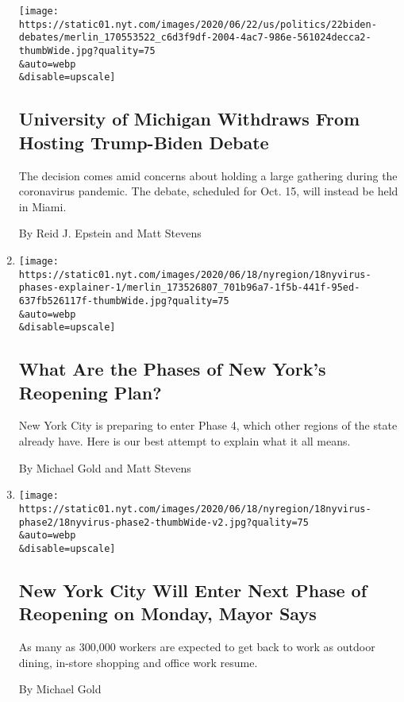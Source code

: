 \begin{enumerate}
  \texttt{[image: https://static01.nyt.com/images/2020/06/22/us/politics/22biden-debates/merlin\_170553522\_c6d3f9df-2004-4ac7-986e-561024decca2-thumbWide.jpg?quality=75\\\&auto=webp\\\&disable=upscale]}

  \hypertarget{university-of-michigan-withdraws-from-hosting-trump-biden-debate}{%
  \subsection{University of Michigan Withdraws From Hosting Trump-Biden
  Debate}\label{university-of-michigan-withdraws-from-hosting-trump-biden-debate}}

  The decision comes amid concerns about holding a large gathering
  during the coronavirus pandemic. The debate, scheduled for Oct. 15,
  will instead be held in Miami.

  By Reid J. Epstein and Matt Stevens
\item
  \href{/article/new-york-phase-reopening.html}{}

  \texttt{[image: https://static01.nyt.com/images/2020/06/18/nyregion/18nyvirus-phases-explainer-1/merlin\_173526807\_701b96a7-1f5b-441f-95ed-637fb526117f-thumbWide.jpg?quality=75\\\&auto=webp\\\&disable=upscale]}

  \hypertarget{what-are-the-phases-of-new-yorks-reopening-plan}{%
  \subsection{What Are the Phases of New York's Reopening
  Plan?}\label{what-are-the-phases-of-new-yorks-reopening-plan}}

  New York City is preparing to enter Phase 4, which other regions of
  the state already have. Here is our best attempt to explain what it
  all means.

  By Michael Gold and Matt Stevens
\item
  \href{/2020/06/18/nyregion/phase-2-reopening-nyc.html}{}

  \texttt{[image: https://static01.nyt.com/images/2020/06/18/nyregion/18nyvirus-phase2/18nyvirus-phase2-thumbWide-v2.jpg?quality=75\\\&auto=webp\\\&disable=upscale]}

  \hypertarget{new-york-city-will-enter-next-phase-of-reopening-on-monday-mayor-says}{%
  \subsection{New York City Will Enter Next Phase of Reopening on
  Monday, Mayor
  Says}\label{new-york-city-will-enter-next-phase-of-reopening-on-monday-mayor-says}}

  As many as 300,000 workers are expected to get back to work as outdoor
  dining, in-store shopping and office work resume.

  By Michael Gold
\end{enumerate}

